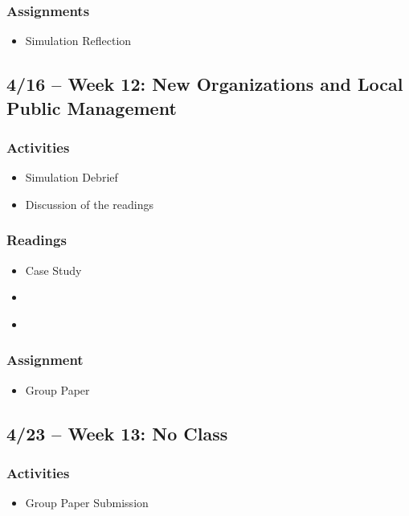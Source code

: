 \documentclass[12pt, letterpaper]{article}
\begin{document}
    \subsubsection*{Assignments}
        \begin{itemize}
            \item Simulation Reflection
        \end{itemize}

\subsection*{4/16 -- Week 12: New Organizations and Local Public Management}
    \subsubsection*{Activities}
        \begin{itemize}
            \item Simulation Debrief
            \item Discussion of the readings
        \end{itemize}
    \subsubsection*{Readings}
        \begin{itemize}
            \item Case Study
            \item \citet[chapter 6]{Agranoff2023}
            \item \citet[chapter 9--10]{Henderson2015}
        \end{itemize}
    \subsubsection*{Assignment}
        \begin{itemize}
            \item Group Paper
        \end{itemize}

\subsection*{4/23 -- Week 13: No Class} 
    \subsubsection*{Activities}
        \begin{itemize}
            \item Group Paper Submission
        \end{itemize}
\end{document}
